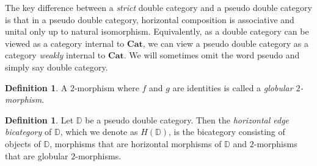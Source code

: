\documentclass[11pt]{amsart}
\newcommand{\cat}[1]{\mathbf{#1}}
\newcommand{\dblcat}[1]{\mathbb{#1}}
\theoremstyle{remark}
\theoremstyle{definition}
\newtheorem{defn}[thm]{Definition}
\begin{document}
The key difference between a \emph{strict} double category and a pseudo double category is that in a pseudo double category, horizontal composition is associative and unital only up to natural isomorphism. Equivalently, as a double category can be viewed as a category internal to $\cat{Cat}$, we can view a pseudo double category as a category \emph{weakly} internal to $\cat{Cat}$. We will sometimes omit the word pseudo and simply say double category.

\begin{defn}
	A $2$-morphism where $f$ and $g$ are identities is called a \emph{globular $2$-morphism}.
\end{defn}

\begin{defn}
	Let $\dblcat{D}$ be a pseudo double category. Then the \emph{horizontal edge bicategory} of $\dblcat{D}$, which we denote as $H(\dblcat{D})$, is the bicategory consisting of objects of $\dblcat{D}$, morphisms that are horizontal morphisms of $\dblcat{D}$ and $2$-morphisms that are globular $2$-morphisms.
\end{defn}
\end{document}
